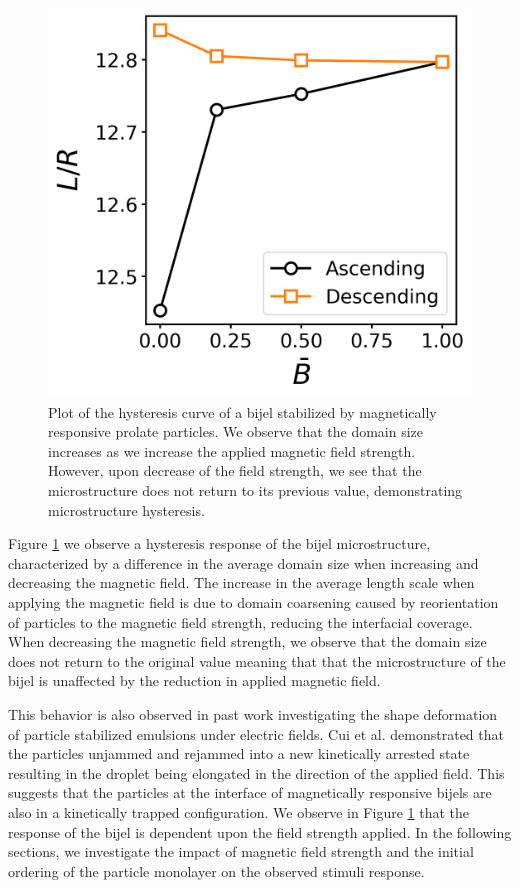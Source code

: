 \begin{figure} 
    \centering 
    \includegraphics[scale=0.5]{../figures/results/paper2/hysteresis_curve.png} 
    \caption{Plot of the hysteresis curve of a bijel stabilized by magnetically responsive prolate particles. We observe that the domain size increases as we 
    increase the applied magnetic field strength. However, upon decrease of the field strength, we see that the microstructure does not return to its previous value,
    demonstrating microstructure hysteresis.} 
    \label{fig:hysteresis_curve} 
\end{figure}

Figure \ref{fig:hysteresis_curve} we observe a hysteresis response of the bijel microstructure, characterized by a difference in the average domain size
when increasing and decreasing the magnetic field. The increase in the average length scale when applying the magnetic field is due to domain coarsening caused by 
reorientation of particles to the magnetic field strength, reducing the interfacial coverage. When decreasing the magnetic field strength, 
we observe that the domain size does not return to the original value meaning that that the microstructure of the bijel is unaffected by 
the reduction in applied magnetic field. 

This behavior is also observed in past work investigating the shape deformation of particle stabilized emulsions under 
electric fields. \cite{cui_stabilizing_2013} Cui et al. demonstrated that the particles unjammed and rejammed into a new kinetically arrested state resulting in
the droplet being elongated in the direction of the applied field. This suggests that the particles at the interface of magnetically responsive bijels are also 
in a kinetically trapped configuration. We observe in Figure \ref{fig:hysteresis_curve} that the response of the bijel is dependent upon the field strength applied.
In the following sections, we investigate the impact of magnetic field strength and the initial ordering of the particle monolayer on the observed stimuli response.

